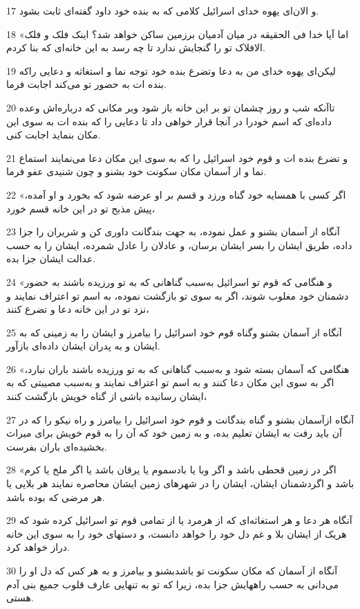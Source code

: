 \par 17 و الان‌ای یهوه خدای اسرائیل کلامی که به بنده خود داود گفته‌ای ثابت بشود.
\par 18 «اما آیا خدا فی الحقیقه در میان آدمیان برزمین ساکن خواهد شد؟ اینک فلک و فلک الافلاک تو را گنجایش ندارد تا چه رسد به این خانه‌ای که بنا کردم.
\par 19 لیکن‌ای یهوه خدای من به دعا وتضرع بنده خود توجه نما و استغاثه و دعایی راکه بنده ات به حضور تو می‌کند اجابت فرما.
\par 20 تاآنکه شب و روز چشمان تو بر این خانه باز شود وبر مکانی که درباره‌اش وعده داده‌ای که اسم خودرا در آنجا قرار خواهی داد تا دعایی را که بنده ات به سوی این مکان بنماید اجابت کنی.
\par 21 و تضرع بنده ات و قوم خود اسرائیل را که به سوی این مکان دعا می‌نمایند استماع نما و از آسمان مکان سکونت خود بشنو و چون شنیدی عفو فرما.
\par 22 «اگر کسی با همسایه خود گناه ورزد و قسم بر او عرضه شود که بخورد و او آمده، پیش مذبح تو در این خانه قسم خورد،
\par 23 آنگاه از آسمان بشنو و عمل نموده، به جهت بندگانت داوری کن و شریران را جزا داده، طریق ایشان را بسر ایشان برسان، و عادلان را عادل شمرده، ایشان را به حسب عدالت ایشان جزا بده.
\par 24 «و هنگامی که قوم تو اسرائیل به‌سبب گناهانی که به تو ورزیده باشند به حضور دشمنان خود مغلوب شوند، اگر به سوی تو بازگشت نموده، به اسم تو اعتراف نمایند و نزد تو در این خانه دعا و تضرع کنند،
\par 25 آنگاه از آسمان بشنو وگناه قوم خود اسرائیل را بیامرز و ایشان را به زمینی که به ایشان و به پدران ایشان داده‌ای بازآور.
\par 26 «هنگامی که آسمان بسته شود و به‌سبب گناهانی که به تو ورزیده باشند باران نبارد، اگر به سوی این مکان دعا کنند و به اسم تو اعتراف نمایند و به‌سبب مصیبتی که به ایشان رسانیده باشی از گناه خویش بازگشت کنند،
\par 27 آنگاه ازآسمان بشنو و گناه بندگانت و قوم خود اسرائیل را بیامرز و راه نیکو را که در آن باید رفت به ایشان تعلیم بده، و به زمین خود که آن را به قوم خویش برای میراث بخشیده‌ای باران بفرست.
\par 28 «اگر در زمین قحطی باشد و اگر وبا یا بادسموم یا یرقان باشد یا اگر ملخ یا کرم باشد و اگردشمنان ایشان، ایشان را در شهرهای زمین ایشان محاصره نمایند هر بلایی یا هر مرضی که بوده باشد.
\par 29 آنگاه هر دعا و هر استغاثه‌ای که از هرمرد یا از تمامی قوم تو اسرائیل کرده شود که هریک از ایشان بلا و غم دل خود را خواهد دانست، و دستهای خود را به سوی این خانه دراز خواهد کرد.
\par 30 آنگاه از آسمان که مکان سکونت تو باشدبشنو و بیامرز و به هر کس که دل او را می‌دانی به حسب راههایش جزا بده، زیرا که تو به تنهایی عارف قلوب جمیع بنی آدم هستی.
